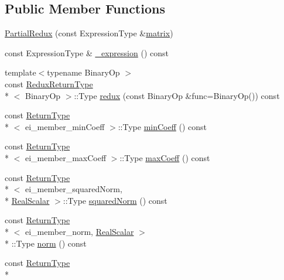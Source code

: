 \subsection*{Public Member Functions}
\begin{DoxyCompactItemize}
\item 
\hyperlink{class_partial_redux_a1a1773c14a15936278d511b457dbccb9}{Partial\-Redux} (const Expression\-Type \&\hyperlink{glext_8h_a7b24a3f2f56eb1244ae69dacb4fecb6f}{matrix})
\item 
const Expression\-Type \& \hyperlink{class_partial_redux_a13557fe59f84c8b0da7800f797c3ae07}{\-\_\-expression} () const 
\item 
{\footnotesize template$<$typename Binary\-Op $>$ }\\const \hyperlink{struct_partial_redux_1_1_redux_return_type}{Redux\-Return\-Type}\\*
$<$ Binary\-Op $>$\-::Type \hyperlink{class_partial_redux_acad1e9e1eff16fdc3fc9fb06584d73c0}{redux} (const Binary\-Op \&func=Binary\-Op()) const 
\item 
const \hyperlink{struct_partial_redux_1_1_return_type}{Return\-Type}\\*
$<$ ei\-\_\-member\-\_\-min\-Coeff $>$\-::Type \hyperlink{class_partial_redux_aa8148bbea4fa0742492aeffd73f8ecb3}{min\-Coeff} () const 
\item 
const \hyperlink{struct_partial_redux_1_1_return_type}{Return\-Type}\\*
$<$ ei\-\_\-member\-\_\-max\-Coeff $>$\-::Type \hyperlink{class_partial_redux_ac6a4a94dd4ed742f1590a7a8e19e1a08}{max\-Coeff} () const 
\item 
const \hyperlink{struct_partial_redux_1_1_return_type}{Return\-Type}\\*
$<$ ei\-\_\-member\-\_\-squared\-Norm, \\*
\hyperlink{class_partial_redux_ab90e980b51024c769907a8646b38c713}{Real\-Scalar} $>$\-::Type \hyperlink{class_partial_redux_acb7c5f987773f641c5388ec88bcaaa70}{squared\-Norm} () const 
\item 
const \hyperlink{struct_partial_redux_1_1_return_type}{Return\-Type}\\*
$<$ ei\-\_\-member\-\_\-norm, \hyperlink{class_partial_redux_ab90e980b51024c769907a8646b38c713}{Real\-Scalar} $>$\\*
\-::Type \hyperlink{class_partial_redux_a62501f3df4dd9e5d664707395e220c2c}{norm} () const 
\item 
const \hyperlink{struct_partial_redux_1_1_return_type}{Return\-Type}\\*

\end{DoxyCompactItemize}
